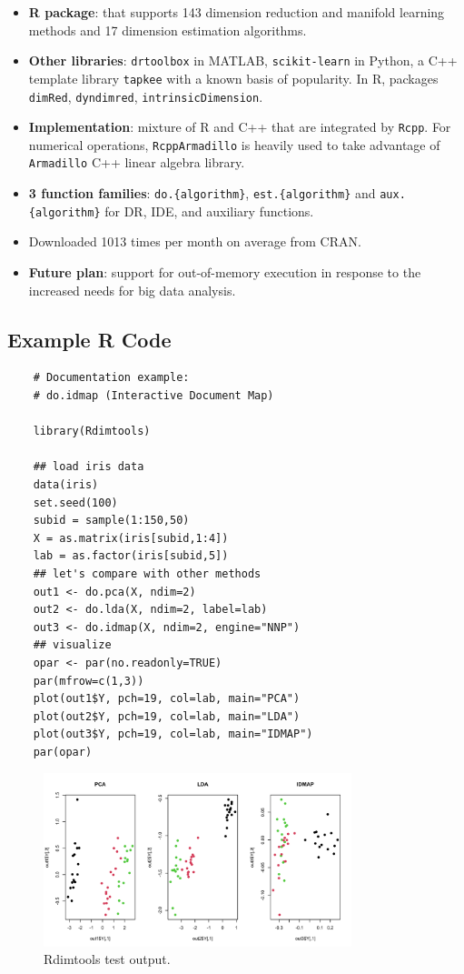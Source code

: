 \documentclass[a4paper,12pt]{article}
\begin{document}
\begin{itemize}
    \item \textbf{R package}: that supports 143 dimension reduction and manifold learning methods and 17 dimension estimation algorithms.
    \item \textbf{Other libraries}: \texttt{drtoolbox} in MATLAB, \texttt{scikit-learn} in Python, a C++ template library \texttt{tapkee} with a known basis of popularity. In R, packages \texttt{dimRed}, \texttt{dyndimred}, \texttt{intrinsicDimension}.
    \item \textbf{Implementation}: mixture of R and C++ that are integrated by \texttt{Rcpp}. For numerical operations, \texttt{RcppArmadillo} is heavily used to take advantage of \texttt{Armadillo} C++ linear algebra library.
    \item  \textbf{3 function families}: \verb|do.{algorithm}|, \verb|est.{algorithm}| and \verb|aux.{algorithm}| for DR, IDE, and auxiliary functions.
    \item Downloaded 1013 times per month on average from CRAN.
    \item \textbf{Future plan}: support for out-of-memory execution in response to the increased needs for big data analysis.
\end{itemize}

\subsection{Example R Code}

\begin{verbatim}
    # Documentation example:
    # do.idmap (Interactive Document Map)

    library(Rdimtools)

    ## load iris data
    data(iris)
    set.seed(100)
    subid = sample(1:150,50)
    X = as.matrix(iris[subid,1:4])
    lab = as.factor(iris[subid,5])
    ## let's compare with other methods
    out1 <- do.pca(X, ndim=2)
    out2 <- do.lda(X, ndim=2, label=lab)
    out3 <- do.idmap(X, ndim=2, engine="NNP")
    ## visualize
    opar <- par(no.readonly=TRUE)
    par(mfrow=c(1,3))
    plot(out1$Y, pch=19, col=lab, main="PCA")
    plot(out2$Y, pch=19, col=lab, main="LDA")
    plot(out3$Y, pch=19, col=lab, main="IDMAP")
    par(opar)
\end{verbatim}

\begin{figure}[ht]
    \centering
    \includegraphics[width=0.8\textwidth]{figures/Rdimtools_test.png}
    \caption{Rdimtools test output.}
    \label{fig:rdimtools_test}
\end{figure}
\end{document}
